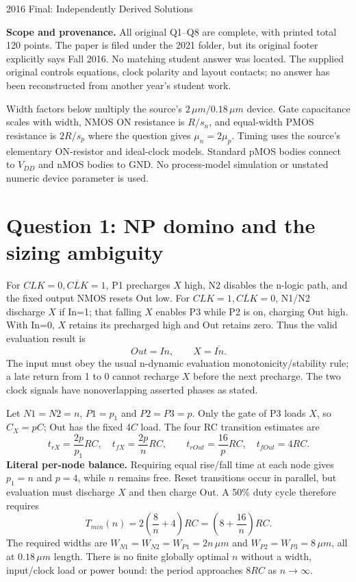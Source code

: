 \documentclass[10pt]{article}
\begin{document}
\begin{center}{\Large 2016 Final: Independently Derived Solutions}\end{center}
\textbf{Scope and provenance.} All original Q1--Q8 are complete, with printed total 120 points. The paper is filed under the 2021 folder, but its original footer explicitly says Fall 2016. No matching student answer was located. The supplied original controls equations, clock polarity and layout contacts; no answer has been reconstructed from another year's student work.

Width factors below multiply the source's $2\,\mu m/0.18\,\mu m$ device. Gate capacitance scales with width, NMOS ON resistance is $R/s_n$, and equal-width PMOS resistance is $2R/s_p$ where the question gives $\mu_n=2\mu_p$. Timing uses the source's elementary ON-resistor and ideal-clock models. Standard pMOS bodies connect to $V_{DD}$ and nMOS bodies to GND. No process-model simulation or unstated numeric device parameter is used.

\section*{Question 1: NP domino and the sizing ambiguity}
For $CLK=0,\overline{CLK}=1$, P1 precharges $X$ high, N2 disables the n-logic path, and the fixed output NMOS resets Out low. For $CLK=1,\overline{CLK}=0$, N1/N2 discharge $X$ if In=1; that falling $X$ enables P3 while P2 is on, charging Out high. With In=0, $X$ retains its precharged high and Out retains zero. Thus the valid evaluation result is
\[\boxed{Out=In,\qquad X=\overline{In}.}\]
The input must obey the usual n-dynamic evaluation monotonicity/stability rule; a late return from 1 to 0 cannot recharge $X$ before the next precharge. The two clock signals have nonoverlapping asserted phases as stated.

Let $N1=N2=n$, $P1=p_1$ and $P2=P3=p$. Only the gate of P3 loads $X$, so $C_X=pC$; Out has the fixed $4C$ load. The four RC transition estimates are
\[t_{rX}=\frac{2p}{p_1}RC,\quad t_{fX}=\frac{2p}{n}RC,\qquad
t_{rOut}=\frac{16}{p}RC,\quad t_{fOut}=4RC.\]
\textbf{Literal per-node balance.} Requiring equal rise/fall time at each node gives $p_1=n$ and $p=4$, while $n$ remains free. Reset transitions occur in parallel, but evaluation must discharge $X$ and then charge Out. A 50\% duty cycle therefore requires
\[\boxed{T_{min}(n)=2\left(\frac8n+4\right)RC=\left(8+\frac{16}{n}\right)RC.}\]
The required widths are $W_{N1}=W_{N2}=W_{P1}=2n\,\mu m$ and $W_{P2}=W_{P3}=8\,\mu m$, all at $0.18\,\mu m$ length. There is no finite globally optimal $n$ without a width, input/clock load or power bound: the period approaches $8RC$ as $n\to\infty$.
\end{document}
